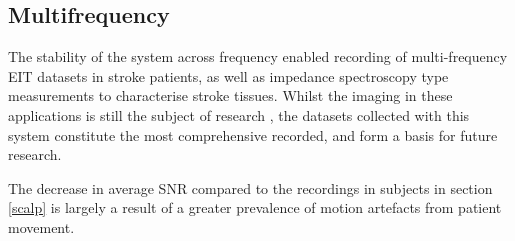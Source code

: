 \subsection{Multifrequency}
The stability of the system across frequency enabled recording of multi-frequency EIT datasets in stroke patients, as well as impedance spectroscopy type measurements to characterise stroke tissues. Whilst the imaging in these applications is still the subject of research \cite{malone2015} \cite{jang2015detection}, the datasets collected with this system constitute the most comprehensive recorded, and form a basis for future research. 

The decrease in average SNR compared to the recordings in subjects in section \ref{scalp} is largely a result of a greater prevalence of motion artefacts from patient movement. 